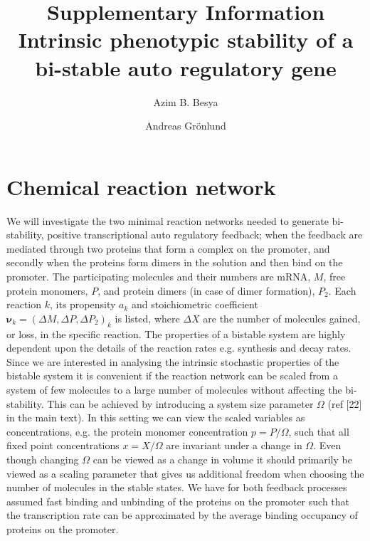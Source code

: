 \documentclass[notitlepage,dvips,rmp,fleqn,superscriptaddress,floatfix]{revtex4-1}
\begin{document}
\author{Azim B. Besya}
\author{Andreas Gr\"onlund}

\title{Supplementary Information\\
\small Intrinsic phenotypic stability of a bi-stable auto regulatory gene}

\setcounter{page}{1}


\maketitle

\section{Chemical reaction network}

\noindent We will investigate the two minimal reaction networks needed to generate bi-stability, positive transcriptional auto regulatory feedback; when the feedback are mediated through two proteins that form a complex on the promoter, and secondly when the proteins form dimers in the solution and then bind on the promoter. The participating molecules and their numbers are mRNA, $M$, free protein monomers, $P$, and protein dimers (in case of dimer formation), $P_2$. Each reaction $k$, its propensity $a_k$ and stoichiometric coefficient $\bm{\nu}_k=(\Delta M,\Delta P,\Delta P_2)_k$ is listed, where $\Delta X$ are the number of molecules gained, or loss, in the specific reaction. The properties of a bistable system are highly dependent upon the details of the reaction rates e.g. synthesis and decay rates. Since we are interested in analysing the intrinsic stochastic properties of the bistable system it is convenient if the reaction network can be scaled from a system of few molecules to a large number of molecules without affecting the bi-stability. This can be achieved by introducing a system size parameter $\Omega$ (ref [22] in the main text). In this setting we can view the scaled variables as concentrations, e.g. the protein monomer concentration $p=P/\Omega$, such that all fixed point concentrations $x=X/\Omega$ are invariant under a change in $\Omega$. Even though changing $\Omega$ can be viewed as a change in volume it should primarily be viewed as a scaling parameter that gives us additional freedom when choosing the number of molecules in the stable states. We have for both feedback processes assumed fast binding and unbinding of the proteins on the promoter such that the transcription rate can be approximated by the average binding occupancy of proteins on the promoter.
\end{document}

